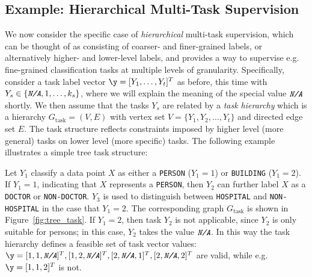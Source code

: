 \documentclass[letterpaper]{article}
\begin{document}
\begin{appendix}
\subsection{Example: Hierarchical Multi-Task Supervision}
\label{appendix:hierarchical}
We now consider the specific case of \textit{hierarchical} multi-task supervision, which can be thought of as consisting of coarser- and finer-grained labels, or alternatively higher- and lower-level labels, and provides a way to supervise e.g. fine-grained classification tasks at multiple levels of granularity.
Specifically, consider a task label vector $\y = [Y_1, \ldots, Y_t]^T$ as before, this time with $Y_s \in \{\textit{\texttt{N/A}}, 1, \ldots, k_s\}$, where we will explain the meaning of the special value $\textit{\texttt{N/A}}$ shortly.
We then assume that the tasks $Y_s$ are related by a \textit{task hierarchy} which is a hierarchy $G_{\text{task}} = (V,E)$ with vertex set $V = \{Y_1, Y_2, \ldots, Y_t\}$ and directed edge set $E$.
 The task structure reflects constraints imposed by higher level (more general) tasks on lower level (more specific) tasks.
 The following example illustrates a simple tree  task structure:

\begin{example}
Let $Y_1$ classify a data point $X$ as either a \texttt{PERSON} ($Y_1 = 1$) or \texttt{BUILDING} ($Y_1 = 2$).
If $Y_1 = 1$, indicating that $X$ represents a \texttt{PERSON}, then $Y_2$ can further label $X$ as a \texttt{DOCTOR} or \texttt{NON-DOCTOR}.
$Y_3$ is used to distinguish between \texttt{HOSPITAL} and \texttt{NON-HOSPITAL} in the case that $Y_1 = 2$.
The corresponding graph $G_{\text{task}}$ is shown in Figure~\ref{fig:tree_task}.
If $Y_1=2$, then task $Y_2$ is not applicable, since $Y_2$ is only suitable for persons; in this case, $Y_2$ takes the value $\textit{\texttt{N/A}}$.
In this way the task hierarchy defines a feasible set of task vector values: $ \y = [1, 1, \textit{\texttt{N/A}}]^T, [1, 2, \textit{\texttt{N/A}}]^T, [2,\textit{\texttt{N/A}}, 1]^T, [2,\textit{\texttt{N/A}}, 2]^T$ are valid, while e.g. $\y = [1, 1, 2]^T$ is not.
\label{ex:task_structure}
\end{example}


\end{appendix}
\end{document}
